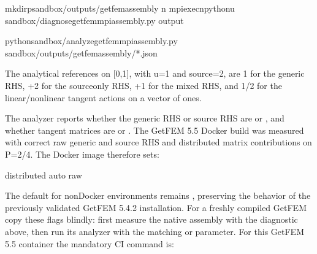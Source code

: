 \documentclass[letterpaper,10pt,english]{sphinxmanual}
\begin{document}
\begin{sphinxVerbatim}[commandchars=\\\{\}]
mkdir\PYGZhy{}psandbox/outputs/getfem\PYGZhy{}assembly
n
mpiexec\PYGZhy{}npython\PYGZhy{}u
sandbox/diagnose\PYGZus{}getfem\PYGZus{}mpi\PYGZus{}assembly.py
\PYGZhy{}\PYGZhy{}output

pythonsandbox/analyze\PYGZus{}getfem\PYGZus{}mpi\PYGZus{}assembly.py
sandbox/outputs/getfem\PYGZhy{}assembly/*.json
\end{sphinxVerbatim}

\sphinxAtStartPar
The analytical references on {[}0,1{]}, with u=1 and source=2,
are \sphinxhyphen{}1 for the generic RHS, +2 for the source\sphinxhyphen{}only RHS,
+1 for the mixed RHS, and 1/2 for the linear/nonlinear
tangent actions on a vector of ones.

\sphinxAtStartPar
The analyzer reports whether the generic RHS or source RHS
are  or , and whether tangent
matrices are  or . The GetFEM 5.5 Docker build was measured with
correct raw generic and source RHS and distributed matrix
contributions on P=2/4. The Docker image therefore sets:

\begin{sphinxVerbatim}[commandchars=\\\{\}]
distributed
auto
raw
\end{sphinxVerbatim}

\sphinxAtStartPar
The default for non\sphinxhyphen{}Docker environments remains
, preserving the behavior
of the previously validated  GetFEM 5.4.2 installation.
For a freshly compiled GetFEM  copy these flags blindly:
first measure the native assembly with the diagnostic above, then
run its analyzer with the matching 
or  parameter. For this GetFEM 5.5
container the mandatory CI command is:
\end{document}
